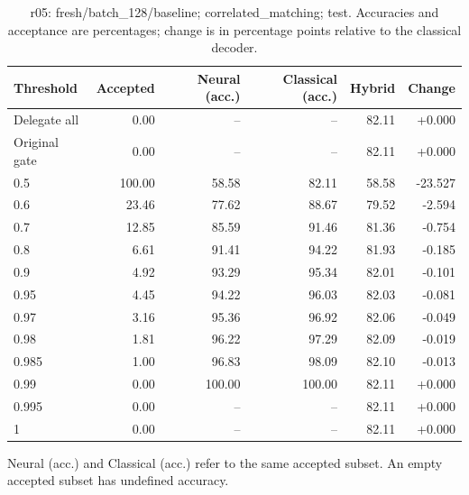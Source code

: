 \begin{table}[htbp]
\centering\small
\setlength{\tabcolsep}{3pt}
\caption{r05: fresh/batch\_128/baseline; correlated\_matching; test. Accuracies and acceptance are percentages; change is in percentage points relative to the classical decoder.}
\begin{tabular}{lrrrrr}
\toprule
Threshold & Accepted & Neural (acc.) & Classical (acc.) & Hybrid & Change \\
\midrule
Delegate all & 0.00 & -- & -- & 82.11 & +0.000 \\
Original gate & 0.00 & -- & -- & 82.11 & +0.000 \\
0.5 & 100.00 & 58.58 & 82.11 & 58.58 & -23.527 \\
0.6 & 23.46 & 77.62 & 88.67 & 79.52 & -2.594 \\
0.7 & 12.85 & 85.59 & 91.46 & 81.36 & -0.754 \\
0.8 & 6.61 & 91.41 & 94.22 & 81.93 & -0.185 \\
0.9 & 4.92 & 93.29 & 95.34 & 82.01 & -0.101 \\
0.95 & 4.45 & 94.22 & 96.03 & 82.03 & -0.081 \\
0.97 & 3.16 & 95.36 & 96.92 & 82.06 & -0.049 \\
0.98 & 1.81 & 96.22 & 97.29 & 82.09 & -0.019 \\
0.985 & 1.00 & 96.83 & 98.09 & 82.10 & -0.013 \\
0.99 & 0.00 & 100.00 & 100.00 & 82.11 & +0.000 \\
0.995 & 0.00 & -- & -- & 82.11 & +0.000 \\
1 & 0.00 & -- & -- & 82.11 & +0.000 \\
\bottomrule
\end{tabular}
\par\smallskip\footnotesize Neural (acc.) and Classical (acc.) refer to the same accepted subset. An empty accepted subset has undefined accuracy.
\end{table}

